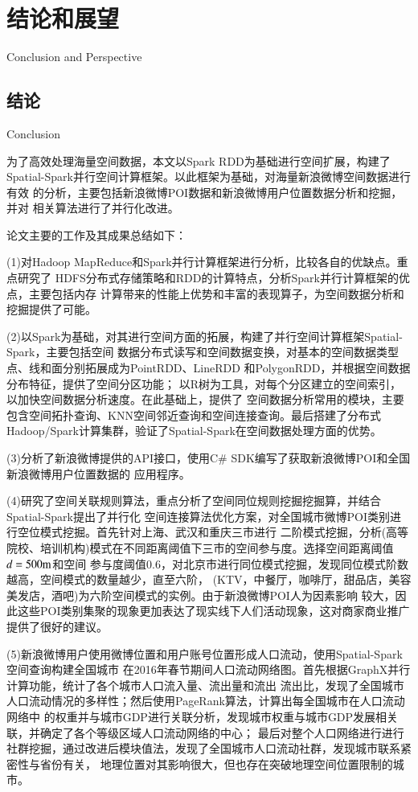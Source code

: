 \chapter{结论和展望}{Conclusion and Perspective}

\section{结论}{Conclusion}

为了高效处理海量空间数据，本文以Spark RDD为基础进行空间扩展，构建了
Spatial-Spark并行空间计算框架。以此框架为基础，对海量新浪微博空间数据进行有效
的分析，主要包括新浪微博POI数据和新浪微博用户位置数据分析和挖掘，并对
相关算法进行了并行化改进。

论文主要的工作及其成果总结如下：

(1)对Hadoop MapReduce和Spark并行计算框架进行分析，比较各自的优缺点。重点研究了
HDFS分布式存储策略和RDD的计算特点，分析Spark并行计算框架的优点，主要包括内存
计算带来的性能上优势和丰富的表现算子，为空间数据分析和挖掘提供了可能。

(2)以Spark为基础，对其进行空间方面的拓展，构建了并行空间计算框架Spatial-Spark，主要包括空间
数据分布式读写和空间数据变换，对基本的空间数据类型点、线和面分别拓展成为PointRDD、LineRDD
和PolygonRDD，并根据空间数据分布特征，提供了空间分区功能；
以R树为工具，对每个分区建立的空间索引，以加快空间数据分析速度。在此基础上，提供了
空间数据分析常用的模块，主要包含空间拓扑查询、KNN空间邻近查询和空间连接查询。最后搭建了分布式
Hadoop/Spark计算集群，验证了Spatial-Spark在空间数据处理方面的优势。

(3)分析了新浪微博提供的API接口，使用C\# SDK编写了获取新浪微博POI和全国新浪微博用户位置数据的
应用程序。

(4)研究了空间关联规则算法，重点分析了空间同位规则挖掘挖掘算，并结合Spatial-Spark提出了并行化
空间连接算法优化方案，对全国城市微博POI类别进行空位模式挖掘。首先针对上海、武汉和重庆三市进行
二阶模式挖掘，分析(高等院校、培训机构)模式在不同距离阈值下三市的空间参与度。选择空间距离阈值$d=500\text{\rm{m}}$和空间
参与度阈值$0.6$，对北京市进行同位模式挖掘，发现同位模式阶数越高，空间模式的数量越少，直至六阶，
(KTV，中餐厅，咖啡厅，甜品店，美容美发店，酒吧)为六阶空间模式的实例。由于新浪微博POI人为因素影响
较大，因此这些POI类别集聚的现象更加表达了现实线下人们活动现象，这对商家商业推广提供了很好的建议。

(5)新浪微博用户使用微博位置和用户账号位置形成人口流动，使用Spatial-Spark空间查询构建全国城市
在2016年春节期间人口流动网络图。首先根据GraphX并行计算功能，统计了各个城市人口流入量、流出量和流出
流出比，发现了全国城市人口流动情况的多样性；然后使用PageRank算法，计算出每全国城市在人口流动网络中
的权重并与城市GDP进行关联分析，发现城市权重与城市GDP发展相关联，并确定了各个等级区域人口流动网络的中心；
最后对整个人口网络进行进行社群挖掘，通过改进后模块值法，发现了全国城市人口流动社群，发现城市联系紧密性与省份有关，
地理位置对其影响很大，但也存在突破地理空间位置限制的城市。

